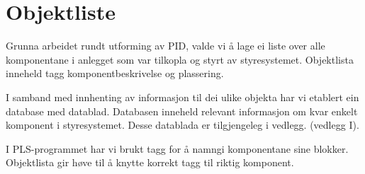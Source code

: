 \section{Objektliste}
\thispagestyle{fancy}

Grunna arbeidet rundt utforming av \gls{PID}, valde vi å lage ei liste over alle komponentane i anlegget som var tilkopla og styrt av styresystemet.
Objektlista inneheld tagg komponentbeskrivelse og plassering. 

I samband med innhenting av informasjon til dei ulike objekta har vi etablert ein database med datablad.
Databasen inneheld relevant informasjon om kvar enkelt komponent i styresystemet.\newline
Desse datablada er tilgjengeleg i vedlegg. (vedlegg I). 

I \gls{PLS}-programmet har vi brukt tagg for å namngi komponentane sine blokker.\newline
Objektlista gir høve til å knytte korrekt tagg til riktig komponent.

\newpage


